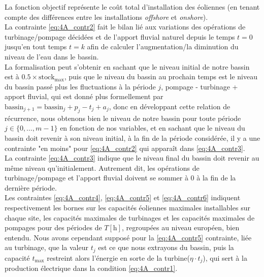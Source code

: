 \documentclass{article}
\newcommand{\unit}[1]{[\mathrm{#1}]}
\begin{document}
\newpage

La fonction objectif représente le coût total d'installation des éoliennes (en tenant compte des différences entre les installations \textit{offshore} et \textit{onshore}). \\
La contrainte \eqref{eq:4A_contr2} fait le bilan lié aux variations des opérations de turbinage/pompage décidées et de l'apport fluvial naturel depuis le temps $t = 0$ jusqu'en tout temps $t = k$ afin de calculer l'augmentation/la diminution du niveau de l'eau dans le bassin.\\
La formalisation peut s'obtenir en sachant que le niveau initial de notre bassin est à $0.5 \times \mathrm{stock}_\mathrm{max}$, puis que le niveau du bassin au prochain temps est le niveau du bassin passé plus les fluctuations à la période $j$, pompage - turbinage + apport fluvial, qui est donné plus formellement par $\mathrm{bassin}_{j+1} = \mathrm{bassin}_{j} + p_j - t_j + a_j$, donc en développant cette relation de récurrence, nous obtenons 
bien le niveau de notre bassin pour toute période $j \in \{ 0, \ldots, m-1 \}$ en fonction de nos variables, et en sachant que le niveau du bassin doit revenir à son niveau initial, à la fin 
de la période considérée, il y a une contrainte "en moins" pour \eqref{eq:4A_contr2} qui apparaît dans \eqref{eq:4A_contr3}. \\
La contrainte \eqref{eq:4A_contr3} indique que le niveau final du bassin doit revenir au même niveau qu'initialement. Autrement dit, les opérations de turbinage/pompage et 
l'apport fluvial doivent se sommer à 0 à la fin de la dernière période.\\
Les contraintes \eqref{eq:4A_contr4}, \eqref{eq:4A_contr5} et \eqref{eq:4A_contr6} indiquent respectivement les bornes sur les capacités éoliennes maximales installables sur chaque site, 
les capacités maximales de turbinages et les capacités maximales de pompages pour des périodes de $T \unit{h}$, regroupées au niveau européen, bien entendu.
Nous avons cependant supposé pour la \eqref{eq:4A_contr5} contrainte, liée au turbinage, que la valeur $t_j$ est ce que 
nous extrayons du bassin, puis
la capacité $t_\mathrm{max}$ restreint alors l'énergie en sorte de la turbine($\eta \cdot t_j$), qui sert à la 
production électrique dans la condition \eqref{eq:4A_contr1}.

\newpage %
\end{document}
